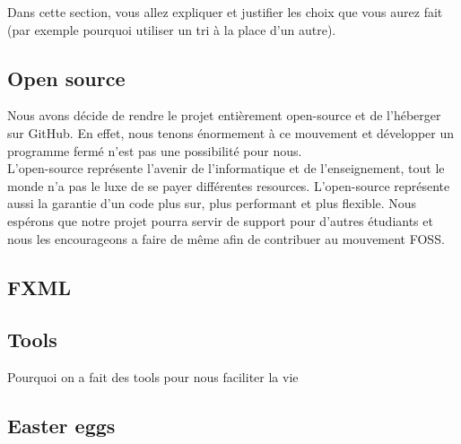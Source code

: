 \documentclass[../main.tex]{subfiles}
\begin{document}
Dans cette section, vous allez expliquer et justifier les choix que vous aurez fait (par exemple pourquoi utiliser un tri à la place d'un autre).

\subsection{Open source}
Nous avons décide de rendre le projet entièrement open-source et de l'héberger sur GitHub. 
En effet, nous tenons énormement à ce mouvement et développer un programme fermé n'est pas une possibilité pour nous. \\

L'open-source représente l'avenir de l'informatique et de l'enseignement, tout le monde n'a pas le luxe de se payer différentes resources.
L'open-source représente aussi la garantie d'un code plus sur, plus performant et plus flexible.
Nous espérons que notre projet pourra servir de support pour d'autres étudiants et nous les encourageons a faire de même 
afin de contribuer au mouvement FOSS.

\subsection{FXML}

\subsection{Tools}
Pourquoi on a fait des tools pour nous faciliter la vie

\subsection{Easter eggs}
\end{document}
